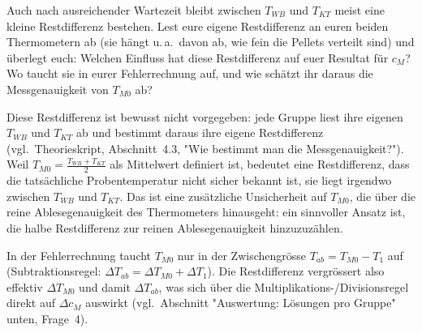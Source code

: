 \documentclass[11pt,a4paper]{article}
\newcommand{\Temp}{T}
\begin{document}
\begin{aufgabebox}
Auch nach ausreichender Wartezeit bleibt zwischen $\Temp_{WB}$ und $\Temp_{KT}$ meist eine kleine Restdifferenz bestehen. Lest eure eigene Restdifferenz an euren beiden Thermometern ab (sie hängt u.\,a.\ davon ab, wie fein die Pellets verteilt sind) und überlegt euch: Welchen Einfluss hat diese Restdifferenz auf euer Resultat für $c_M$? Wo taucht sie in eurer Fehlerrechnung auf, und wie schätzt ihr daraus die Messgenauigkeit von $\Temp_{M0}$ ab?
\end{aufgabebox}
\begin{loesungbox}
Diese Restdifferenz ist bewusst nicht vorgegeben: jede Gruppe liest ihre eigenen $\Temp_{WB}$ und $\Temp_{KT}$ ab und bestimmt daraus ihre eigene Restdifferenz (vgl.\ Theorieskript, Abschnitt~4.3, "Wie bestimmt man die Messgenauigkeit?"). Weil $\Temp_{M0}=\frac{\Temp_{WB}+\Temp_{KT}}{2}$ als Mittelwert definiert ist, bedeutet eine Restdifferenz, dass die tatsächliche Probentemperatur nicht sicher bekannt ist, sie liegt irgendwo zwischen $\Temp_{WB}$ und $\Temp_{KT}$. Das ist eine zusätzliche Unsicherheit auf $\Temp_{M0}$, die über die reine Ablesegenauigkeit des Thermometers hinausgeht: ein sinnvoller Ansatz ist, die halbe Restdifferenz zur reinen Ablesegenauigkeit hinzuzuzählen.

In der Fehlerrechnung taucht $\Temp_{M0}$ nur in der Zwischengrösse $T_{ab}=\Temp_{M0}-\Temp_1$ auf (Subtraktionsregel: $\Delta T_{ab}=\Delta\Temp_{M0}+\Delta\Temp_1$). Die Restdifferenz vergrössert also effektiv $\Delta\Temp_{M0}$ und damit $\Delta T_{ab}$, was sich über die Multiplikations-/Divisionsregel direkt auf $\Delta c_M$ auswirkt (vgl.\ Abschnitt "Auswertung: Lösungen pro Gruppe" unten, Frage~4).
\end{loesungbox}
\end{document}
